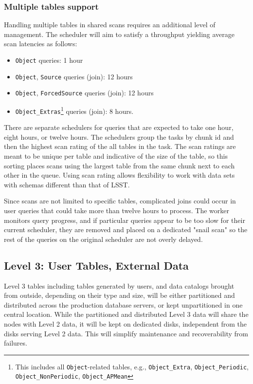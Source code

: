 \documentclass[DM,toc]{lsstdoc}
\begin{document}
\subsubsection{Multiple tables support}\label{shared-scan-multiple-tables-support}

Handling multiple tables in shared scans requires an additional level of
management. The scheduler will aim to satisfy a throughput yielding average
scan latencies as follows:

\begin{itemize}
\item
  \texttt{Object} queries: 1 hour
\item
  \texttt{Object}, \texttt{Source} queries (join): 12 hours
\item
  \texttt{Object}, \texttt{ForcedSource} queries (join): 12 hours
\item
  \texttt{Object\_Extras}\footnote{This includes all
    \texttt{Object}-related tables, e.g., \texttt{Object\_Extra},
    \texttt{Object\_Periodic}, \texttt{Object\_NonPeriodic},
    \texttt{Object\_APMean}} queries (join): 8 hours.
\end{itemize}

There are separate schedulers for queries that are expected to take one hour, eight
hours, or twelve hours. The schedulers group the tasks by chunk id and
then the highest scan rating of the all tables in the task. The scan ratings
are meant to be unique per table and indicative of the size of the table, so
this sorting places scans using the largest table from the same chunk next to
each other in the queue. Using scan rating allows flexibility to work with
data sets with schemas different than that of LSST.

Since scans are not limited to specific tables, complicated joins could
occur in user queries that could take more than twelve hours to process.
The worker monitors query progress, and if particular queries appear to be
too slow for their current scheduler, they are removed and placed on a
dedicated "snail scan" so the rest of the queries on the original scheduler
are not overly delayed.

\subsection{Level 3: User Tables, External Data}\label{level-3-user-tables-external-data}

Level 3 tables including tables generated by users, and data catalogs
brought from outside, depending on their type and size, will be either
partitioned and distributed across the production database servers, or
kept unpartitioned in one central location. While the partitioned and
distributed Level 3 data will share the nodes with Level 2 data, it will
be kept on dedicated disks, independent from the disks serving Level 2
data. This will simplify maintenance and recoverability from failures.
\end{document}
